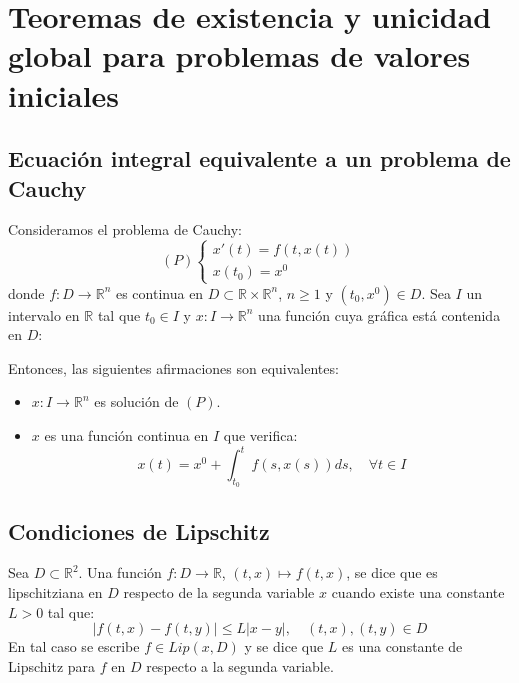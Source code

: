 \chapter{Teoremas de existencia y unicidad global para problemas de valores iniciales}
\section{Ecuación integral equivalente a un problema de Cauchy}
\begin{theorem}
    Consideramos el problema de Cauchy:
    $$(P) \begin{cases}
            x'(t) = f(t, x(t)) \\
            x(t_0) = x^0
        \end{cases}$$
    donde $f: D \to \mathbb{R}^n$ es continua en $D \subset \mathbb{R} \times \mathbb{R}^n$, $n \geq 1$ y $(t_0, x^0) \in D$.
    Sea $I$ un intervalo en $\mathbb{R}$ tal que $t_0 \in I$ y $x: I \to \mathbb{R}^n$ una función cuya gráfica está contenida en $D$:

    Entonces, las siguientes afirmaciones son equivalentes:
    \begin{itemize}
        \item $x: I \to \mathbb{R}^n$ es solución de $(P)$.
        \item $x$ es una función continua en $I$ que verifica:
              $$x(t) = x^0 + \int_{t_0}^t f(s, x(s))ds, \quad \forall t \in I$$
    \end{itemize}
\end{theorem}

\section{Condiciones de Lipschitz}
\begin{definition}
    Sea $D \subset \mathbb{R}^2$.
    Una función $f: D \to \mathbb{R}$, $(t, x) \mapsto f(t, x)$, se dice que es lipschitziana en $D$ respecto de la segunda variable $x$ cuando existe una constante $L > 0$ tal que:
    $$|f(t, x) - f(t, y)| \leq L|x-y|, \quad (t, x), (t, y) \in D$$
    En tal caso se escribe $f \in Lip(x, D)$ y se dice que $L$ es una constante de Lipschitz para $f$ en $D$ respecto a la segunda variable.
\end{definition}

